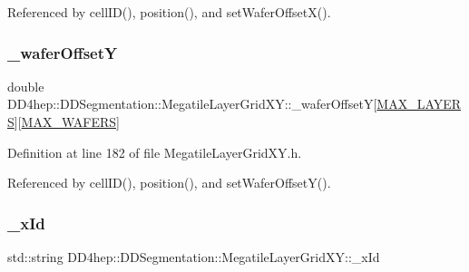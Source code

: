 Referenced by cell\+I\+D(), position(), and set\+Wafer\+Offset\+X().

\hypertarget{class_d_d4hep_1_1_d_d_segmentation_1_1_megatile_layer_grid_x_y_aecce12c3e118e5e9176a46395938e8f8}{}\label{class_d_d4hep_1_1_d_d_segmentation_1_1_megatile_layer_grid_x_y_aecce12c3e118e5e9176a46395938e8f8} 
\subsubsection{\texorpdfstring{\+\_\+wafer\+OffsetY}{\_waferOffsetY}}
{\footnotesize\ttfamily double D\+D4hep\+::\+D\+D\+Segmentation\+::\+Megatile\+Layer\+Grid\+X\+Y\+::\+\_\+wafer\+OffsetY\mbox{[}\hyperlink{_megatile_layer_grid_x_y_8h_ade9d4b2ac5f29fe89ffea40e7c58c9d6}{M\+A\+X\+\_\+\+L\+A\+Y\+E\+RS}\mbox{]}\mbox{[}\hyperlink{_d_d_segmentation_2include_2_d_d_segmentation_2_wafer_grid_x_y_8h_ace2f1e396fdb2a1510290218c8cb476a}{M\+A\+X\+\_\+\+W\+A\+F\+E\+RS}\mbox{]}\hspace{0.3cm}{\ttfamily [protected]}}



Definition at line 182 of file Megatile\+Layer\+Grid\+X\+Y.\+h.



Referenced by cell\+I\+D(), position(), and set\+Wafer\+Offset\+Y().

\hypertarget{class_d_d4hep_1_1_d_d_segmentation_1_1_megatile_layer_grid_x_y_a84cfbe6eadc2e1dfd01b276ec5a06cb3}{}\label{class_d_d4hep_1_1_d_d_segmentation_1_1_megatile_layer_grid_x_y_a84cfbe6eadc2e1dfd01b276ec5a06cb3} 
\subsubsection{\texorpdfstring{\+\_\+x\+Id}{\_xId}}
{\footnotesize\ttfamily std\+::string D\+D4hep\+::\+D\+D\+Segmentation\+::\+Megatile\+Layer\+Grid\+X\+Y\+::\+\_\+x\+Id\hspace{0.3cm}{\ttfamily [protected]}}



